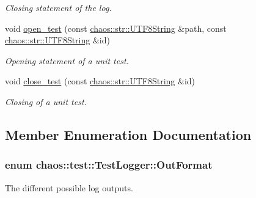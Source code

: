 \begin{DoxyCompactItemize}
\begin{DoxyCompactList}\small\item\em Closing statement of the log. \end{DoxyCompactList}\item 
void \hyperlink{classchaos_1_1test_1_1_test_logger_ac6744b59f304552bb819dd8f4d724143}{open\+\_\+test} (const \hyperlink{classchaos_1_1str_1_1_u_t_f8_string}{chaos\+::str\+::\+U\+T\+F8\+String} \&path, const \hyperlink{classchaos_1_1str_1_1_u_t_f8_string}{chaos\+::str\+::\+U\+T\+F8\+String} \&id)
\begin{DoxyCompactList}\small\item\em Opening statement of a unit test. \end{DoxyCompactList}\item 
void \hyperlink{classchaos_1_1test_1_1_test_logger_a5b1f6f1abbedaea7f5475e0dc2677c3c}{close\+\_\+test} (const \hyperlink{classchaos_1_1str_1_1_u_t_f8_string}{chaos\+::str\+::\+U\+T\+F8\+String} \&id)
\begin{DoxyCompactList}\small\item\em Closing of a unit test. \end{DoxyCompactList}\end{DoxyCompactItemize}


\subsection{Member Enumeration Documentation}
\hypertarget{classchaos_1_1test_1_1_test_logger_a8e6f679501d623e41ac0f0c445a7820d}{}
\subsubsection[{Out\+Format}]{\setlength{\rightskip}{0pt plus 5cm}enum {\bf chaos\+::test\+::\+Test\+Logger\+::\+Out\+Format}}\label{classchaos_1_1test_1_1_test_logger_a8e6f679501d623e41ac0f0c445a7820d}


The different possible log outputs. 

